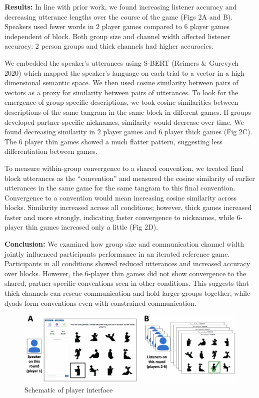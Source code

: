 \documentclass[11pt,a4paper]{article}
\begin{document}

\textbf{Results:} In line with prior work, we found increasing listener accuracy and decreasing utterance lengths over the course of the game (Figs 2A and B). Speakers used fewer words in 2 player games compared to 6 player games independent of block. Both group size and channel width affected listener accuracy: 2 person groups and thick channels had higher accuracies. 

We embedded the speaker's utterances using S-BERT (Reimers \& Gurevych 2020) which mapped the speaker's language on each trial to a vector in a high-dimensional semantic space. We then used cosine similarity between pairs of vectors as a proxy for similarity between pairs of utterances. To look for the emergence of group-specific descriptions, we took cosine similarities between descriptions of the same tangram in the same block in different games. If groups developed partner-specific nicknames, similarity would decrease over time. We found decreasing similarity in 2 player games and 6 player thick games (Fig 2C). The 6 player thin games showed a much flatter pattern, suggesting less differentiation between games. 

To measure within-group convergence to a shared convention, we treated final block utterances as the ``convention'' and measured the cosine similarity of earlier utterances in the same game for the same tangram to this final convention. Convergence to a convention would mean increasing cosine similarity across blocks. Similarity increased across all conditions; however, thick games increased faster and more strongly, indicating faster convergence to nicknames, while 6-player thin games increased only a little (Fig 2D). 

\textbf{Conclusion:} We examined how group size and communication channel width jointly influenced participants performance in an iterated reference game. Participants in all conditions showed reduced utterances and increased accuracy over blocks. However, the 6-player thin games did not show convergence to the shared, partner-specific conventions seen in other conditions. This suggests that thick channels can rescue communication and hold larger groups together, while dyads form conventions even with constrained communication. 

\newpage

\begin{figure}
	\includegraphics[width=\textwidth]{../images/interface-1.pdf}
	\caption{Schematic of player interface}
\end{figure}
\end{document}
